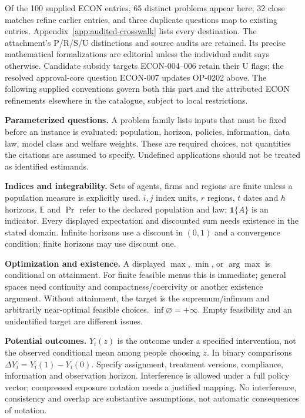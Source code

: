 \documentclass[11pt,a4paper]{article}
\begin{document}
\label{audited:conventions}

Of the 100 supplied ECON entries, 65 distinct problems appear here; 32 close
matches refine earlier entries, and three duplicate questions map to existing
entries. Appendix~\ref{app:audited-crosswalk} lists every destination.
The attachment's P/R/S/U distinctions and source audits are retained. Its
precise mathematical formalizations are editorial unless the individual audit
says otherwise. Candidate subsidy targets ECON-004--006 retain their U flags;
the resolved approval-core question ECON-007 updates OP-0202 above.
The following supplied conventions govern both this part and the attributed
ECON refinements elsewhere in the catalogue, subject to local restrictions.

\textbf{Parameterized questions.} A problem family lists inputs that must be fixed before an instance is evaluated: population, horizon, policies, information, data law, model class and welfare weights. These are required choices, not quantities the citations are assumed to specify. Undefined applications should not be treated as identified estimands.

\textbf{Indices and integrability.} Sets of agents, firms and regions are finite unless a population measure is explicitly used. \(i,j\) index units, \(r\) regions, \(t\) dates and \(h\) horizons. \(\mathbb E\) and \(\Pr\) refer to the declared population and law; \(\mathbf1\{A\}\) is an indicator. Every displayed expectation and discounted sum needs existence in the stated domain. Infinite horizons use a discount in \((0,1)\) and a convergence condition; finite horizons may use discount one.

\textbf{Optimization and existence.} A displayed \(\max\), \(\min\), or \(\arg\max\) is conditional on attainment. For finite feasible menus this is immediate; general spaces need continuity and compactness/coercivity or another existence argument. Without attainment, the target is the supremum/infimum and arbitrarily near-optimal feasible choices. \(\inf\varnothing=+\infty\). Empty feasibility and an unidentified target are different issues.

\textbf{Potential outcomes.} \(Y_i(z)\) is the outcome under a specified intervention, not the observed conditional mean among people choosing \(z\). In binary comparisons \(\Delta Y_i=Y_i(1)-Y_i(0)\). Specify assignment, treatment versions, compliance, information and observation horizon. Interference is allowed under a full policy vector; compressed exposure notation needs a justified mapping. No interference, consistency and overlap are substantive assumptions, not automatic consequences of notation.
\end{document}
